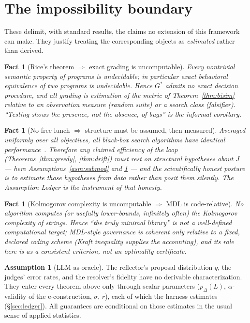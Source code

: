\documentclass[11pt]{article}
\theoremstyle{plain}
\newtheorem{fact}[theorem]{Fact} %
\theoremstyle{definition}
\newtheorem{assumption}[theorem]{Assumption}
\theoremstyle{remark}
\begin{document}
\section{The impossibility boundary}\label{sec:impossibility}

These delimit, with standard results, the claims no extension of this
framework can make. They justify treating the corresponding objects as
\emph{estimated} rather than derived.

\begin{fact}[Rice's theorem $\Rightarrow$ exact grading is uncomputable]
Every nontrivial semantic property of programs is undecidable; in particular
exact behavioral equivalence of two programs is undecidable. Hence $G^\ast$
admits no exact decision procedure, and all grading is estimation of the
metric of Theorem~\ref{thm:bisim} relative to an observation measure (random
suite) or a search class (falsifier). ``Testing shows the presence, not the
absence, of bugs'' is the informal corollary.
\end{fact}

\begin{fact}[No free lunch $\Rightarrow$ structure must be assumed, then measured]
Averaged uniformly over all objectives, all black-box search algorithms have
identical performance~\cite{nfl}. Therefore \emph{any} claimed efficiency of
the loop (Theorems~\ref{thm:greedy}, \ref{thm:drift}) must rest on structural
hypotheses about $J$ --- here Assumptions~\ref{asm:submod} and
\ref{asm:proposal} --- and the scientifically honest posture is to estimate
those hypotheses from data rather than posit them silently. The Assumption
Ledger is the instrument of that honesty.
\end{fact}

\begin{fact}[Kolmogorov complexity is uncomputable $\Rightarrow$ MDL is code-relative]
No algorithm computes (or usefully lower-bounds, infinitely often) the
Kolmogorov complexity of strings. Hence ``the truly minimal library'' is not
a well-defined computational target; MDL-style governance is coherent only
relative to a fixed, declared coding scheme (Kraft inequality supplies the
accounting), and its role here is as a consistent \emph{criterion}, not an
optimality \emph{certificate}.
\end{fact}

\begin{assumption}[LLM-as-oracle]\label{asm:proposal}
The reflector's proposal distribution $q$, the judges' error rates, and the
resolver's fidelity have no derivable characterization. They enter every
theorem above only through scalar parameters
($p_\Delta(L)$, $\alpha$-validity of the e-construction, $\sigma$, $r$),
each of which the harness estimates (\S\ref{sec:ledger}). All guarantees are
conditional on those estimates in the usual sense of applied statistics.
\end{assumption}
\end{document}
